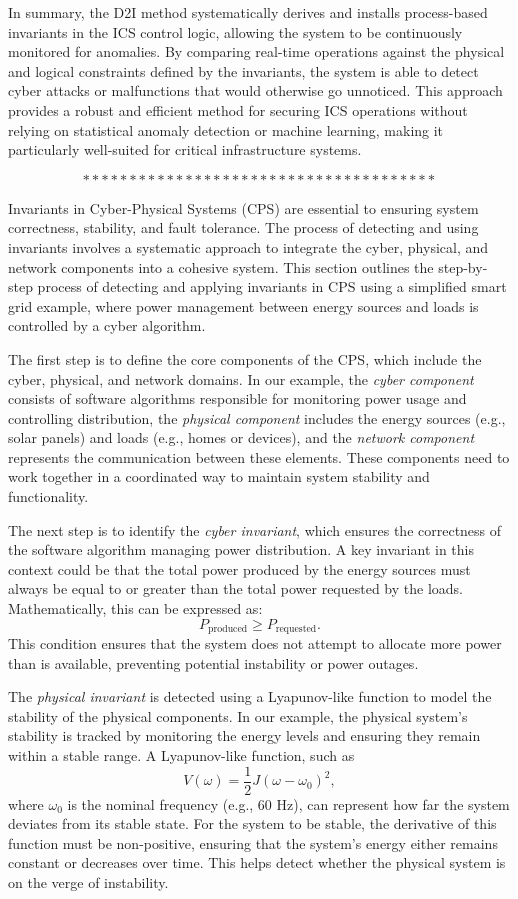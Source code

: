 In summary, the D2I method systematically derives and installs process-based invariants in the ICS control logic, allowing the system to be continuously monitored for anomalies. By comparing real-time operations against the physical and logical constraints defined by the invariants, the system is able to detect cyber attacks or malfunctions that would otherwise go unnoticed. This approach provides a robust and efficient method for securing ICS operations without relying on statistical anomaly detection or machine learning, making it particularly well-suited for critical infrastructure systems\cite{26}.

$$**************************************$$

Invariants in Cyber-Physical Systems (CPS) are essential to ensuring system correctness, stability, and fault tolerance. The process of detecting and using invariants involves a systematic approach to integrate the cyber, physical, and network components into a cohesive system. This section outlines the step-by-step process of detecting and applying invariants in CPS using a simplified smart grid example, where power management between energy sources and loads is controlled by a cyber algorithm.

The first step is to define the core components of the CPS, which include the cyber, physical, and network domains. In our example, the \textit{cyber component} consists of software algorithms responsible for monitoring power usage and controlling distribution, the \textit{physical component} includes the energy sources (e.g., solar panels) and loads (e.g., homes or devices), and the \textit{network component} represents the communication between these elements. These components need to work together in a coordinated way to maintain system stability and functionality.

The next step is to identify the \textit{cyber invariant}, which ensures the correctness of the software algorithm managing power distribution. A key invariant in this context could be that the total power produced by the energy sources must always be equal to or greater than the total power requested by the loads. Mathematically, this can be expressed as:
\[
P_{\text{produced}} \geq P_{\text{requested}}.
\]
This condition ensures that the system does not attempt to allocate more power than is available, preventing potential instability or power outages.

The \textit{physical invariant} is detected using a Lyapunov-like function to model the stability of the physical components. In our example, the physical system's stability is tracked by monitoring the energy levels and ensuring they remain within a stable range. A Lyapunov-like function, such as 
\[
V(\omega) = \frac{1}{2} J (\omega - \omega_0)^2,
\]
where \( \omega_0 \) is the nominal frequency (e.g., 60 Hz), can represent how far the system deviates from its stable state. For the system to be stable, the derivative of this function must be non-positive, ensuring that the system's energy either remains constant or decreases over time. This helps detect whether the physical system is on the verge of instability.

